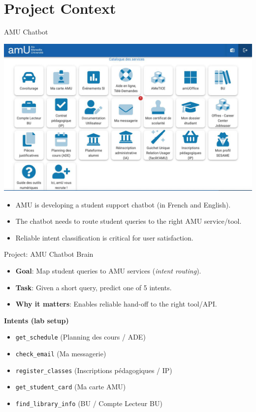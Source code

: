 \documentclass[aspectratio=169]{beamer}
\begin{document}
\section{Project Context}
\begin{frame}{AMU Chatbot}
  \begin{center}
\includegraphics[width=0.5\linewidth]{ent_etudiant.png}
  \end{center}
  \begin{itemize}
    \item AMU is developing a student support chatbot (in French and English).
    \item The chatbot needs to route student queries to the right AMU service/tool.
    \item Reliable intent classification is critical for user satisfaction.
  \end{itemize}
\end{frame}



\begin{frame}{Project: AMU Chatbot Brain}
  \begin{itemize}
    \item \textbf{Goal}: Map student queries to AMU services (\emph{intent routing}).
    \item \textbf{Task}: Given a short query, predict one of 5 intents.
    \item \textbf{Why it matters}: Enables reliable hand-off to the right tool/API.
  \end{itemize}
  \vspace{0.4em}
  \textbf{Intents (lab setup)}
  \begin{itemize}
    \item \texttt{get\_schedule} (Planning des cours / ADE)
    \item \texttt{check\_email} (Ma messagerie)
    \item \texttt{register\_classes} (Inscriptions p\'edagogiques / IP)
    \item \texttt{get\_student\_card} (Ma carte AMU)
    \item \texttt{find\_library\_info} (BU / Compte Lecteur BU)
  \end{itemize}
\end{frame}
\end{document}
